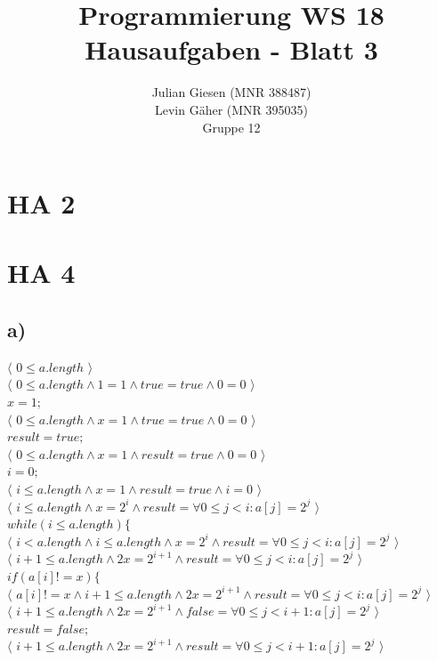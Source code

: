 \documentclass[a4paper]{article}
\title{ Programmierung WS 18 \\ Hausaufgaben - Blatt 3 }
\author{ Julian Giesen (MNR 388487) \\
Levin Gäher (MNR 395035) \\
Gruppe 12 }
\date{  }
\begin{document}
\maketitle

\section*{ HA 2 }

\section*{ HA 4 }

\subsection*{a)}
$\langle$ $0 \leq a.length$ $\rangle$\\
$\langle$ $0 \leq a.length \land 1=1 \land true = true \land 0 = 0$ $\rangle$\\
$x = 1;$ \\
$\langle$ $0 \leq a.length \land x=1 \land true = true \land 0 = 0$ $\rangle$\\
$result = true;$ \\
$\langle$ $0 \leq a.length \land x=1 \land result = true \land 0 = 0$ $\rangle$\\
$i = 0;$ \\
$\langle$ $i \leq a.length \land x=1 \land result = true \land i = 0$ $\rangle$\\
$\langle$ $i \leq a.length \land x=2^i \land result = \forall 0 \leq j < i: a[j] = 2^j$ $\rangle$\\
$while (i \leq a.length) \{$ \\
$\langle$ $i < a.length \land i \leq a.length \land x=2^i \land result = \forall 0 \leq j < i: a[j] = 2^j$ $\rangle$\\
$\langle$ $i + 1 \leq a.length \land 2x=2^{i + 1} \land result = \forall 0 \leq j < i: a[j] = 2^j$ $\rangle$\\
$if (a[i] != x) \{$\\
$\langle$ $a[i] != x \land i + 1 \leq a.length \land 2x=2^{i + 1} \land result = \forall 0 \leq j < i: a[j] = 2^j$ $\rangle$\\
$\langle$ $i + 1 \leq a.length \land 2x=2^{i + 1} \land false = \forall 0 \leq j < i + 1: a[j] = 2^j$ $\rangle$\\
$result = false;$\\
$\langle$ $i + 1 \leq a.length \land 2x=2^{i + 1} \land result = \forall 0 \leq j < i + 1 : a[j] = 2^j$ $\rangle$\\
\end{document}
